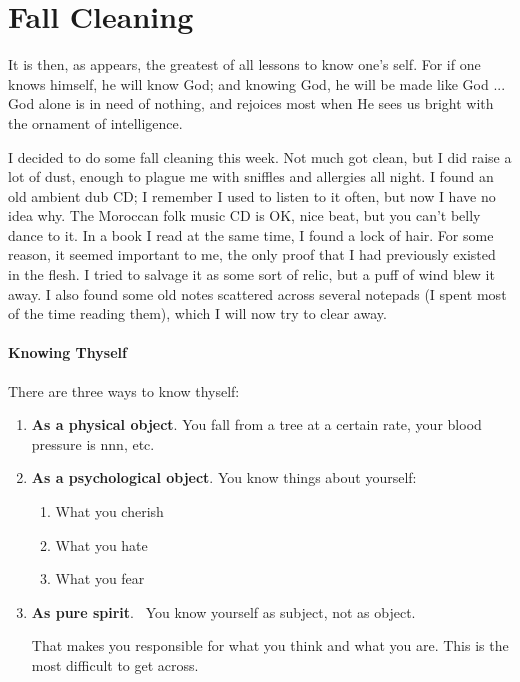 \section{Fall Cleaning}

\begin{quotex}
It is then, as appears, the greatest of all lessons to know one's self. For if one knows himself, he will know God; and knowing God, he will be made like God ... God alone is in need of nothing, and rejoices most when He sees us bright with the ornament of intelligence.
\end{quotex}


I decided to do some fall cleaning this week. Not much got clean, but I did raise a lot of dust, enough to plague me with sniffles and allergies all night. I found an old ambient dub CD; I remember I used to listen to it often, but now I have no idea why. The Moroccan folk music CD is OK, nice beat, but you can't belly dance to it. In a book I read at the same time, I found a lock of hair. For some reason, it seemed important to me, the only proof that I had previously existed in the flesh. I tried to salvage it as some sort of relic, but a puff of wind blew it away. I also found some old notes scattered across several notepads (I spent most of the time reading them), which I will now try to clear away.

\paragraph{Knowing Thyself}


There are three ways to know thyself:

\begin{enumerate}


\item \textbf{As a physical object}. You fall from a tree at a certain rate, your blood pressure is nnn, etc.

\item \textbf{As a psychological object}. You know things about yourself:


  \begin{enumerate}

  
\item What you cherish
  
\item What you hate
  
\item What you fear
  \end{enumerate}


\item \textbf{As pure spirit}. ~You know yourself as subject, not as object.

That makes you responsible for what you think and what you are. This is the most difficult to get across.
\end{enumerate}


